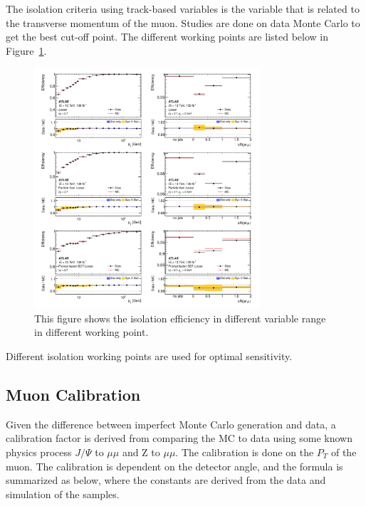 The isolation criteria using track-based variables is the variable that is related to the transverse momentum of the muon. Studies are done on data Monte Carlo to get the best cut-off point. The different working points are listed below in Figure~\ref{fig:isolationWP}.


\begin{figure}[!htb]
    \begin{center}
        \includegraphics[width=0.75\textwidth]{figures/common_ana/IsolationEff1}
        \caption{
            This figure shows the isolation efficiency in different variable range in different working point\cite{Aad:2746302}.
        }
        \label{fig:isolationWP}
    \end{center}
\end{figure}

Different isolation working points are used for optimal sensitivity. 


\subsection{Muon Calibration}
Given the difference between imperfect Monte Carlo generation and data, a calibration factor is derived from comparing the MC to data using some known physics process $J/\Psi$ to $\mu \mu$ and Z to $\mu \mu$. The calibration is done on the $P_{T}$ of the muon. 
The calibration is dependent on the detector angle, and the formula is summarized as below, where the constants are derived from the data and simulation of the samples.

